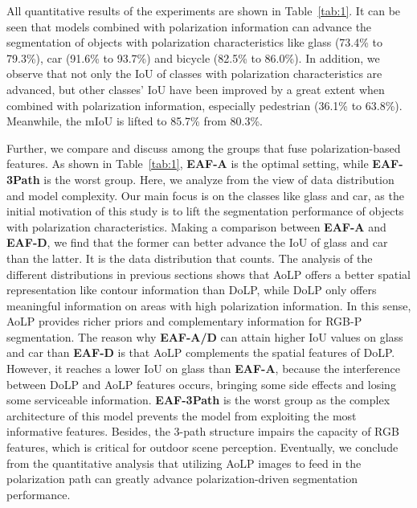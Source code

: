 \documentclass{osa-article}
\begin{document}
All quantitative results of the experiments are shown in Table~\ref{tab:1}. 
It can be seen that models combined with polarization information can advance the segmentation of objects with polarization characteristics like glass (73.4\% to 79.3\%), car (91.6\% to 93.7\%) and bicycle (82.5\% to 86.0\%). 
In addition, we observe that not only the IoU of classes with polarization characteristics are advanced, but other classes' IoU have been improved by a great extent when combined with polarization information, especially pedestrian (36.1\% to 63.8\%).
Meanwhile, the mIoU is lifted to 85.7\% from 80.3\%.

Further, we compare and discuss among the groups that fuse polarization-based features.
As shown in Table~\ref{tab:1}, \textbf{EAF-A} is the optimal setting, while \textbf{EAF-3Path} is the worst group.
Here, we analyze from the view of data distribution and model complexity.
Our main focus is on the classes like glass and car, as the initial motivation of this study is to lift the segmentation performance of objects with polarization characteristics.
Making a comparison between \textbf{EAF-A} and \textbf{EAF-D}, we find that the former can better advance the IoU of glass and car than the latter. 
It is the data distribution that counts.
The analysis of the different distributions in previous sections shows that AoLP offers a better spatial representation like contour information than DoLP, while DoLP only offers meaningful information on areas with high polarization information.
In this sense, AoLP provides richer priors and complementary information for RGB-P segmentation.
The reason why \textbf{EAF-A/D} can attain higher IoU values on glass and car than \textbf{EAF-D} is that AoLP complements the spatial features of DoLP.
However, it reaches a lower IoU on glass than \textbf{EAF-A}, because the interference between DoLP and AoLP features occurs, bringing some side effects and losing some serviceable information.
\textbf{EAF-3Path} is the worst group as the complex architecture of this model prevents the model from exploiting the most informative features.
Besides, the 3-path structure impairs the capacity of RGB features, which is critical for outdoor scene perception.
Eventually, we conclude from the quantitative analysis that utilizing AoLP images to feed in the polarization path can greatly advance polarization-driven segmentation performance.
\end{document}
